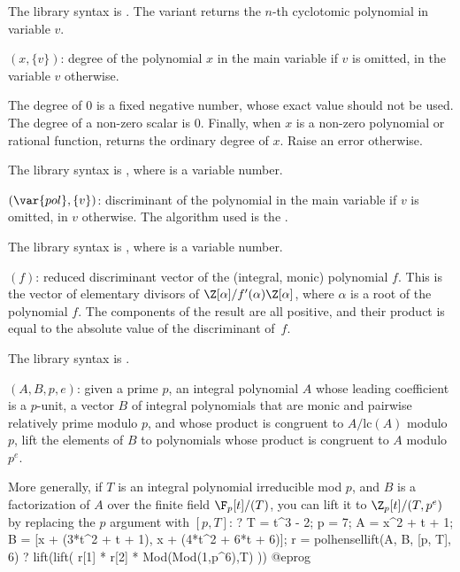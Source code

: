 The library syntax is .
The variant  returns the $n$-th
cyclotomic polynomial in variable $v$.

$(x,\{v\})$: \label{se:poldegree}degree of the polynomial $x$ in the main variable if $v$ is omitted, in
the variable $v$ otherwise.

The degree of $0$ is a fixed negative number, whose exact value should not
be used. The degree of a non-zero scalar is $0$. Finally, when $x$ is a
non-zero polynomial or rational function, returns the ordinary degree of
$x$. Raise an error otherwise.

The library syntax is , where  is a variable number.

$(\var{pol},\{v\})$: \label{se:poldisc}discriminant of the polynomial
 in the main variable if $v$ is omitted, in $v$ otherwise. The
algorithm used is the .

The library syntax is , where  is a variable number.

$(f)$: \label{se:poldiscreduced}reduced discriminant vector of the
(integral, monic) polynomial $f$. This is the vector of elementary divisors
of $\Z[\alpha]/f'(\alpha)\Z[\alpha]$, where $\alpha$ is a root of the
polynomial $f$. The components of the result are all positive, and their
product is equal to the absolute value of the discriminant of~$f$.

The library syntax is .

$(A, B, p, e)$: \label{se:polhensellift}given a prime $p$, an integral polynomial $A$ whose leading coefficient
is a $p$-unit, a vector $B$ of integral polynomials that are monic and
pairwise relatively prime modulo $p$, and whose product is congruent to
$A/\text{lc}(A)$ modulo $p$, lift the elements of $B$ to polynomials whose
product is congruent to $A$ modulo $p^e$.

More generally, if $T$ is an integral polynomial irreducible mod $p$, and
$B$ is a factorization of $A$ over the finite field $\F_p[t]/(T)$, you can
lift it to $\Z_p[t]/(T, p^e)$ by replacing the $p$ argument with $[p,T]$:
\bprog
? { T = t^3 - 2; p = 7; A = x^2 + t + 1;
    B = [x + (3*t^2 + t + 1), x + (4*t^2 + 6*t + 6)];
    r = polhensellift(A, B, [p, T], 6) }
? lift(lift( r[1] * r[2] * Mod(Mod(1,p^6),T) ))
@eprog

